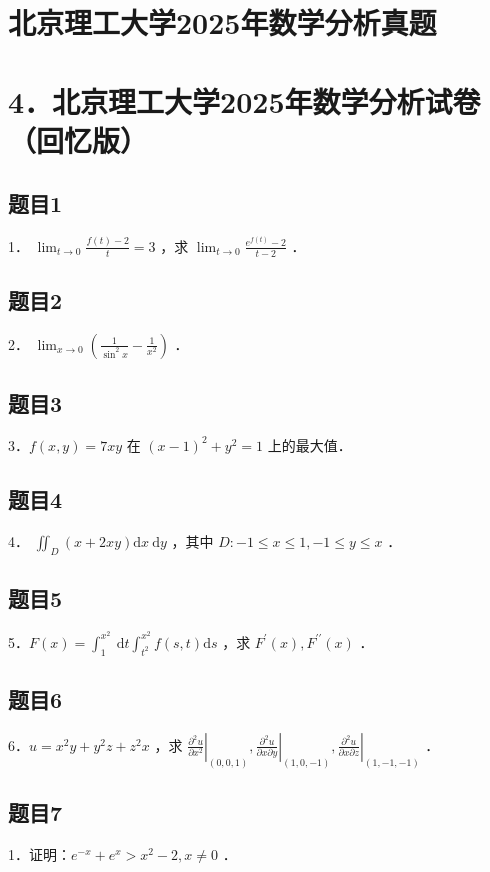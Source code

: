 \documentclass{article}
\begin{document}
\section*{北京理工大学2025年数学分析真题}
\section*{4．北京理工大学2025年数学分析试卷（回忆版）}

\subsection{题目1}
1． \(\lim _{t \rightarrow 0} \frac{f(t)-2}{t}=3\) ，求 \(\lim _{t \rightarrow 0} \frac{e^{f(t)}-2}{t-2}\) ．

\subsection{题目2}
2． \(\lim _{x \rightarrow 0}\left(\frac{1}{\sin ^{2} x}-\frac{1}{x^{2}}\right)\) ．

\subsection{题目3}
3．\(f(x, y)=7 x y\) 在 \((x-1)^{2}+y^{2}=1\) 上的最大值．

\subsection{题目4}
4． \(\iint_{D}(x+2 x y) \mathrm{d} x \mathrm{~d} y\) ，其中 \(D:-1 \leq x \leq 1,-1 \leq y \leq x\) ．

\subsection{题目5}
5．\(F(x)=\int_{1}^{x^{2}} \mathrm{~d} t \int_{t^{2}}^{x^{2}} f(s, t) \mathrm{d} s\) ，求 \(F^{\prime}(x), F^{\prime \prime}(x)\) ．

\subsection{题目6}
6．\(u=x^{2} y+y^{2} z+z^{2} x\) ，求 \(\left.\frac{\partial^{2} u}{\partial x^{2}}\right|_{(0,0,1)},\left.\frac{\partial^{2} u}{\partial x \partial y}\right|_{(1,0,-1)},\left.\frac{\partial^{2} u}{\partial x \partial z}\right|_{(1,-1,-1)}\) ．

\subsection{题目7}
1．证明：\(e^{-x}+e^{x}>x^{2}-2, x \neq 0\) ．
\end{document}
